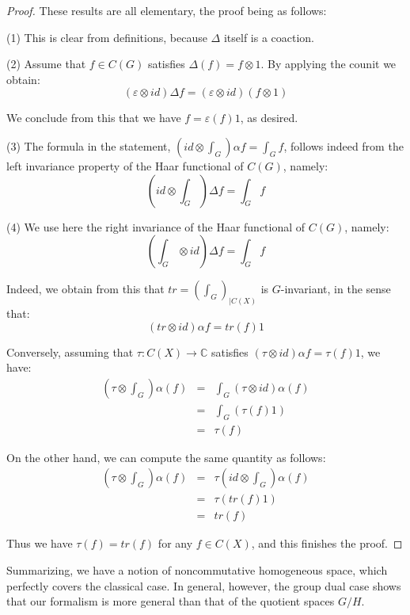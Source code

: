 \documentclass[12pt]{amsbook}
\begin{document}
\begin{proof}
These results are all elementary, the proof being as follows:

\medskip

(1) This is clear from definitions, because $\Delta$ itself is a coaction.

\medskip

(2) Assume that $f\in C(G)$ satisfies $\Delta(f)=f\otimes 1$. By applying the counit we obtain:
$$(\varepsilon\otimes id)\Delta f=(\varepsilon\otimes id)(f\otimes 1)$$

We conclude from this that we have $f=\varepsilon(f)1$, as desired.

\medskip

(3) The formula in the statement, $(id\otimes\int_G)\alpha f=\int_Gf$, follows indeed from the left invariance property of the Haar functional of $C(G)$, namely:
$$\left(id\otimes\int_G\right)\Delta f=\int_Gf$$

(4) We use here the right invariance of the Haar functional of $C(G)$, namely:
$$\left(\int_G\otimes id\right)\Delta f=\int_Gf$$

Indeed, we obtain from this that $tr=(\int_G)_{|C(X)}$ is $G$-invariant, in the sense that:
$$(tr\otimes id)\alpha f=tr(f)1$$

Conversely, assuming that $\tau:C(X)\to\mathbb C$ satisfies $(\tau\otimes id)\alpha f=\tau(f)1$, we have:
\begin{eqnarray*}
\left(\tau\otimes\int_G\right)\alpha(f)
&=&\int_G(\tau\otimes id)\alpha(f)\\
&=&\int_G(\tau(f)1)\\
&=&\tau(f)
\end{eqnarray*}

On the other hand, we can compute the same quantity as follows:
\begin{eqnarray*}
\left(\tau\otimes\int_G\right)\alpha(f)
&=&\tau\left(id\otimes\int_G\right)\alpha(f)\\
&=&\tau(tr(f)1)\\
&=&tr(f)
\end{eqnarray*}

Thus we have $\tau(f)=tr(f)$ for any $f\in C(X)$, and this finishes the proof.
\end{proof}

Summarizing, we have a notion of noncommutative homogeneous space, which perfectly covers the classical case. In general, however, the group dual case shows that our formalism is more general than that of the quotient spaces $G/H$.
\end{document}
